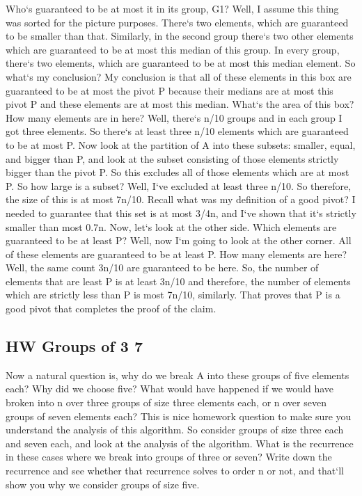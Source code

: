 Who`s guaranteed to be at most it in its group, G1? Well, I assume this thing was sorted for the picture purposes.
There`s two elements, which are guaranteed to be smaller than that.
Similarly, in the second group there`s two other elements which are guaranteed to be at most this median of this group.
In every group, there`s two elements, which are guaranteed to be at most this median element.
So what`s my conclusion? My conclusion is that all of these elements in this box are guaranteed to be at most the pivot P because their medians are at most this pivot P and these elements are at most this median.
What`s the area of this box? How many elements are in here? Well, there`s n/10 groups and in each group I got three elements.
So there`s at least three n/10 elements which are guaranteed to be at most P\@.
Now look at the partition of A into these subsets: smaller, equal, and bigger than P, and look at the subset consisting of those elements strictly bigger than the pivot P\@.
So this excludes all of those elements which are at most P\@.
So how large is a subset? Well, I`ve excluded at least three n/10.
So therefore, the size of this is at most 7n/10.
Recall what was my definition of a good pivot? I needed to guarantee that this set is at most 3/4n, and I`ve shown that it`s strictly smaller than most 0.7n.
Now, let`s look at the other side.
Which elements are guaranteed to be at least P? Well, now I`m going to look at the other corner.
All of these elements are guaranteed to be at least P\@.
How many elements are here? Well, the same count 3n/10 are guaranteed to be here.
So, the number of elements that are least P is at least 3n/10 and therefore, the number of elements which are strictly less than P is most 7n/10, similarly.
That proves that P is a good pivot that completes the proof of the claim.

\subsection{HW  Groups of 3 7}
Now a natural question is, why do we break A into these groups of five elements each? Why did we choose five? What would have happened if we would have broken into n over three groups of size three elements each, or n over seven groups of seven elements each? This is nice homework question to make sure you understand the analysis of this algorithm.
So consider groups of size three each and seven each, and look at the analysis of the algorithm.
What is the recurrence in these cases where we break into groups of three or seven? Write down the recurrence and see whether that recurrence solves to order n or not, and that`ll show you why we consider groups of size five.

